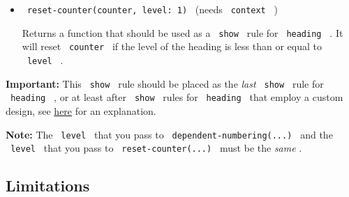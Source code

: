 \begin{enumerate}
  \begin{itemize}
  \item
    \texttt{\ reset-counter(counter,\ level:\ 1)\ } (needs
    \texttt{\ context\ } )

    Returns a function that should be used as a \texttt{\ show\ } rule
    for \texttt{\ heading\ } . It will reset \texttt{\ counter\ } if the
    level of the heading is less than or equal to \texttt{\ level\ } .
  \end{itemize}

  \textbf{Important:} This \texttt{\ show\ } rule should be placed as
  the \emph{last} \texttt{\ show\ } rule for \texttt{\ heading\ } , or
  at least after \texttt{\ show\ } rules for \texttt{\ heading\ } that
  employ a custom design, see
  \href{https://forum.typst.app/t/i-figured-broken-with-custom-template/1730/10?u=jbirnick}{here}
  for an explanation.

\begin{Shaded}
\begin{Highlighting}[]







\end{Highlighting}
\end{Shaded}
\end{enumerate}

\textbf{Note:} The \texttt{\ level\ } that you pass to
\texttt{\ dependent-numbering(...)\ } and the \texttt{\ level\ } that
you pass to \texttt{\ reset-counter(...)\ } must be the \emph{same} .

\subsection{Limitations}\label{limitations}

